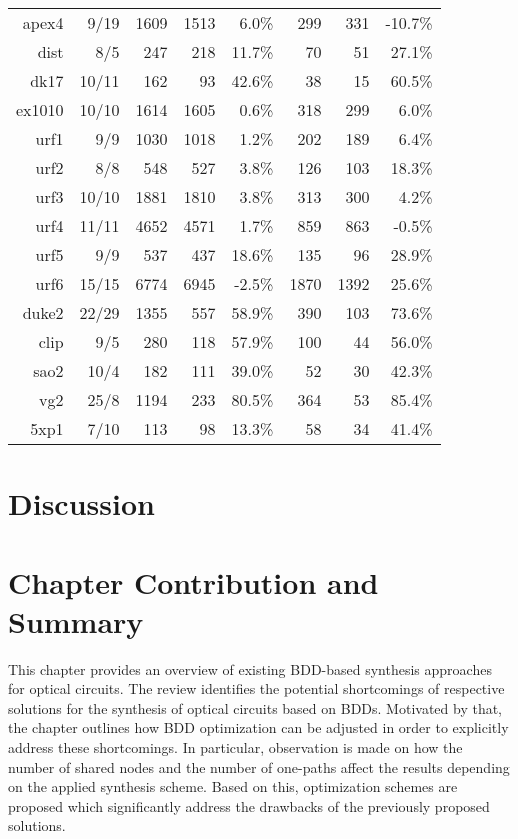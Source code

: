 \documentclass[10pt,letterpaper,twoside,openright]{book}
\begin{document}
\begin{table}[t]
{\begin{tabular}{rr|rrr|rrr}
apex4 & 9/19 & 1609 & 1513 & 6.0\% & 299 & 331 & -10.7\% \\ 
dist & 8/5 & 247 & 218 & 11.7\% & 70 & 51 & 27.1\% \\ 
dk17 & 10/11 & 162 & 93 & 42.6\% & 38 & 15 & 60.5\% \\ 
ex1010 & 10/10 & 1614 & 1605 & 0.6\% & 318 & 299 & 6.0\% \\ 
urf1 & 9/9 & 1030 & 1018 & 1.2\% & 202 & 189 & 6.4\% \\ 
urf2 & 8/8 & 548 & 527 & 3.8\% & 126 & 103 & 18.3\% \\ 
urf3 & 10/10 & 1881 & 1810 & 3.8\% & 313 & 300 & 4.2\% \\ 
urf4 & 11/11 & 4652 & 4571 & 1.7\% & 859 & 863 & -0.5\% \\ 
urf5 & 9/9 & 537 & 437 & 18.6\% & 135 & 96 & 28.9\% \\ 
urf6 & 15/15 & 6774 & 6945 & -2.5\% & 1870 & 1392 & 25.6\% \\ 
duke2 & 22/29 & 1355 & 557 & 58.9\% & 390 & 103 & 73.6\% \\ 
clip & 9/5 & 280 & 118 & 57.9\% & 100 & 44 & 56.0\% \\ 
sao2 & 10/4 & 182 & 111 & 39.0\% & 52 & 30 & 42.3\% \\ 
vg2 & 25/8 & 1194 & 233 & 80.5\% & 364 & 53 & 85.4\% \\ 
5xp1 & 7/10 & 113 & 98 & 13.3\% & 58 & 34 & 41.4\% \\ \hline
\end{tabular}}
\label{tab:reverse-bdd-result}
\end{table}

\section{Discussion}

\newpage

\section{Chapter Contribution and Summary}\label{sec:bdd-summary}

This chapter provides an overview of existing BDD-based synthesis approaches for optical circuits.
The review identifies the potential shortcomings of respective solutions for the synthesis of optical circuits based on BDDs. Motivated by that, the chapter outlines how BDD optimization can be adjusted in order to explicitly address these shortcomings. In particular, observation is made on how the number of shared nodes and the number of one-paths affect the results depending on the applied synthesis scheme. Based on this, optimization schemes are proposed which significantly address the drawbacks of the previously proposed solutions.
\end{document}
